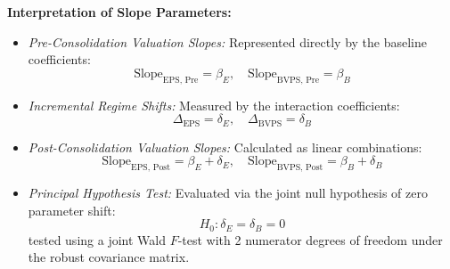 \textbf{Interpretation of Slope Parameters:}
\begin{itemize}
    \item \textit{Pre-Consolidation Valuation Slopes:} Represented directly by the baseline coefficients:
    \begin{equation}
    \text{Slope}_{\text{EPS, Pre}} = \beta_E, \quad \text{Slope}_{\text{BVPS, Pre}} = \beta_B
    \end{equation}
    \item \textit{Incremental Regime Shifts:} Measured by the interaction coefficients:
    \begin{equation}
    \Delta_{\text{EPS}} = \delta_E, \quad \Delta_{\text{BVPS}} = \delta_B
    \end{equation}
    \item \textit{Post-Consolidation Valuation Slopes:} Calculated as linear combinations:
    \begin{equation}
    \text{Slope}_{\text{EPS, Post}} = \beta_E + \delta_E, \quad \text{Slope}_{\text{BVPS, Post}} = \beta_B + \delta_B
    \end{equation}
    \item \textit{Principal Hypothesis Test:} Evaluated via the joint null hypothesis of zero parameter shift:
    \begin{equation}
    H_0: \delta_E = \delta_B = 0
    \end{equation}
    tested using a joint Wald $F$-test with 2 numerator degrees of freedom under the robust covariance matrix.
\end{itemize}

